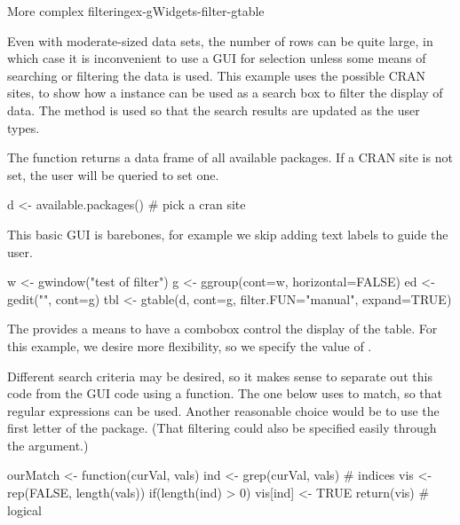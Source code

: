 \begin{example}{More complex filtering}{ex-gWidgets-filter-gtable}

Even with moderate-sized data sets, the number of rows can be quite large, in which case it is
inconvenient to use a GUI for selection unless some means of searching or filtering the
data is used. This example uses the possible CRAN sites, to show how a
 instance can be used as a search box to filter the display of
data. The  method is used so that the search
results are updated as the user types.


The  function returns a data frame of all
available packages. If a CRAN site is not set, the user will be
queried to set one.
\begin{Schunk}
\begin{Sinput}
 d <- available.packages()       # pick a cran site
\end{Sinput}
\end{Schunk}

This basic GUI is barebones, for example we skip adding text labels to guide the user. 
\begin{Schunk}
\begin{Sinput}
 w <- gwindow("test of filter")
 g <- ggroup(cont=w, horizontal=FALSE)
 ed <- gedit("", cont=g)
 tbl <- gtable(d, cont=g, filter.FUN="manual", expand=TRUE)
\end{Sinput}
\end{Schunk}
The  provides a means to have a combobox
control the display of the table. For this example, we desire more
flexibility, so we specify the value of .

Different search criteria may be desired, so it makes sense to
separate out this code from the GUI code using a function. The one below
uses  to match, so that regular expressions can be
used. Another reasonable choice would be to use the first letter of
the package. (That filtering could also be specified easily through the
 argument.)

\begin{Schunk}
\begin{Sinput}
 ourMatch <- function(curVal, vals) {
   ind <- grep(curVal, vals)             # indices
   vis <- rep(FALSE, length(vals))
   if(length(ind) > 0)
     vis[ind] <- TRUE
   return(vis)                           # logical
 }
\end{Sinput}
\end{Schunk}


\end{example}
